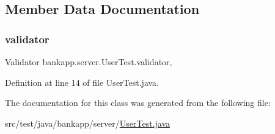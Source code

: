 \subsection{Member Data Documentation}
\mbox{\label{classbankapp_1_1server_1_1_user_test_a2cf04df9520daf97f986e1e5d16dcb29}} 
\subsubsection{\texorpdfstring{validator}{validator}}
{\footnotesize\ttfamily Validator bankapp.\+server.\+User\+Test.\+validator\hspace{0.3cm}{\ttfamily [static]}, {\ttfamily [protected]}}



Definition at line 14 of file User\+Test.\+java.



The documentation for this class was generated from the following file\+:\begin{DoxyCompactItemize}
\item 
src/test/java/bankapp/server/\hyperlink{_user_test_8java}{User\+Test.\+java}\end{DoxyCompactItemize}
